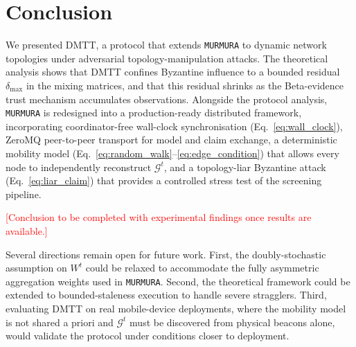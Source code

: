 \documentclass[journal]{IEEEtran}
\newenvironment{added}{\begingroup\color{addedcolor}}{\endgroup}
\theoremstyle{definition}
\theoremstyle{remark}
\begin{document}
\section{Conclusion}
\label{sec:conclusion}

\begin{added}
We presented DMTT, a protocol that extends \texttt{MURMURA} to dynamic network topologies under adversarial topology-manipulation attacks.
The theoretical analysis shows that DMTT confines Byzantine influence to a bounded residual $\delta_{\max}$ in the mixing matrices, and that this residual shrinks as the Beta-evidence trust mechanism accumulates observations.
Alongside the protocol analysis, \texttt{MURMURA} is redesigned into a production-ready distributed framework, incorporating coordinator-free wall-clock synchronisation (Eq.~\eqref{eq:wall_clock}), ZeroMQ peer-to-peer transport for model and claim exchange, a deterministic mobility model (Eq.~\eqref{eq:random_walk}--\eqref{eq:edge_condition}) that allows every node to independently reconstruct $\mathcal{G}^t$, and a topology-liar Byzantine attack (Eq.~\eqref{eq:liar_claim}) that provides a controlled stress test of the screening pipeline.

\textcolor{red}{[Conclusion to be completed with experimental findings once results are available.]}

Several directions remain open for future work. First, the doubly-stochastic assumption on $W^t$ could be relaxed to accommodate the fully asymmetric aggregation weights used in \texttt{MURMURA}. Second, the theoretical framework could be extended to bounded-staleness execution to handle severe stragglers. Third, evaluating DMTT on real mobile-device deployments, where the mobility model is not shared a priori and $\mathcal{G}^t$ must be discovered from physical beacons alone, would validate the protocol under conditions closer to deployment.
\end{added}





\end{document}
